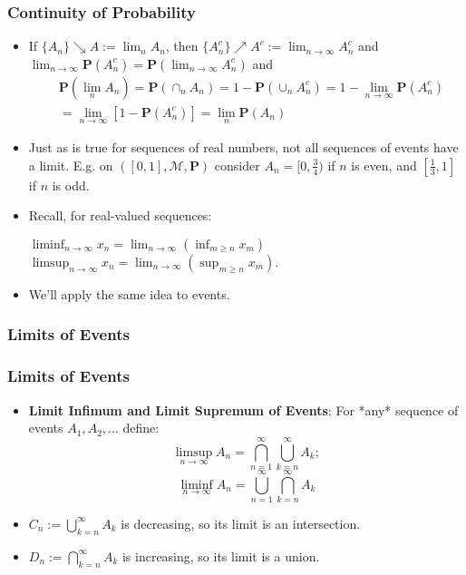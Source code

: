 \documentclass[handout]{beamer}
\newcommand{\BP}{\mathbf{P}}
\begin{document}
\frame
{
  \frametitle{Continuity of Probability}

   \begin{itemize}

\item<1->  If $\{A_n\} \searrow A := \lim_{n} A_n$, then $\{A_n^c\} \nearrow A^c := \lim_{n \to \infty}A_n^c$ and $\lim_{n \to \infty}\BP(A_n^c) = \BP(\lim_{n \to \infty}A_n^c)$ and
\begin{align*}
&\BP(\lim_n A_n) = \BP(\cap_n A_n) = 1- \BP(\cup_n A_n^c) = 1 - \lim_{n \to \infty}\BP(A_n^c) \\
&= \lim_{n \to \infty}\left[1 - \BP(A_n^c)\right] = \lim_n \BP( A_n)
\end{align*}

\item<2->  Just as is true for sequences of real numbers, not all sequences of events have a limit. E.g. on $([0,1],\mathcal{M},\BP)$ consider $A_n = [0,\frac{3}{4})$ if $n$ is even, and $[\frac{1}{3},1]$ if $n$ is odd. 

\item<3->  Recall, for real-valued sequences:
               
$\liminf_{n\rightarrow \infty} x_n=\lim_{n\rightarrow \infty} (\inf_{m\geq n} x_m)$  $\limsup_{n\rightarrow \infty} x_n=\lim_{n\rightarrow \infty} (\sup_{m\geq n} x_m)$.\\
               
\item<4->  We'll apply the same idea to events.

\end{itemize}
}

\subsubsection{Limits of Events}


\frame
{
  \frametitle{Limits of Events}

   \begin{itemize}


    \item<1->  
      \textbf{Limit Infimum and Limit Supremum of Events}: For *any* sequence of events $A_1, A_2,\ldots$ define:
$$\limsup_{n\rightarrow \infty} A_n=\bigcap_{n=1}^{\infty} \bigcup_{k=n}^{\infty} A_k;$$
$$\liminf_{n\rightarrow \infty} A_n=\bigcup_{n=1}^{\infty} \bigcap_{k=n}^{\infty} A_k$$  

\item<2->  $C_n := \bigcup_{k=n}^{\infty} A_k$ is decreasing, so its limit is an intersection.
               
\item<3->  $D_n := \bigcap_{k=n}^{\infty} A_k$ is increasing, so its limit is a union.

                 \end{itemize}
}
\end{document}
